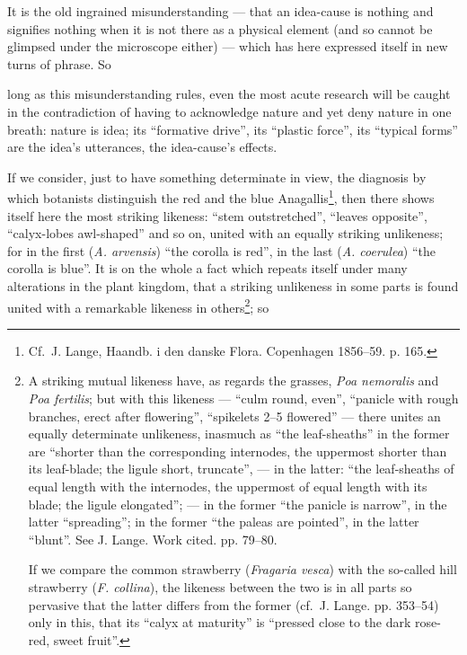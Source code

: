 \documentclass[12pt,a4paper]{book}
\begin{document}
It is the old ingrained misunderstanding --- that an idea-cause is nothing and
signifies nothing when it is not there as a physical element (and so cannot be
glimpsed under the microscope either) --- which has here expressed itself in new
turns of phrase. So

\setcounter{footnote}{0}%
long as this misunderstanding rules, even the most acute research will be caught in
the contradiction of having to acknowledge nature and yet deny nature in one
breath: nature is idea; its ``formative drive'', its ``plastic force'', its
``typical forms'' are the idea's utterances, the idea-cause's effects.

If we consider, just to have something determinate in view, the diagnosis by which
botanists distinguish the red and the blue Anagallis\footnote{Cf.\ J. Lange,
Haandb. i den danske Flora. Copenhagen 1856--59. p. 165.}, then there shows itself
here the most striking likeness: ``stem outstretched'', ``leaves opposite'',
``calyx-lobes awl-shaped'' and so on, united with an equally striking unlikeness;
for in the first (\textit{A. arvensis}) ``the corolla is red'', in the last
(\textit{A. coerulea}) ``the corolla is blue''. It is on the whole a fact which
repeats itself under many alterations in the plant kingdom, that a striking
unlikeness in some parts is found united with a remarkable likeness in
others\footnote{A striking mutual likeness have, as regards the grasses,
\textit{Poa nemoralis} and \textit{Poa fertilis}; but with this likeness ---
``culm round, even'', ``panicle with rough branches, erect after flowering'',
``spikelets 2--5 flowered'' --- there unites an equally determinate unlikeness,
inasmuch as ``the leaf-sheaths'' in the former are ``shorter than the corresponding
internodes, the uppermost shorter than its leaf-blade; the ligule short, truncate'',
--- in the latter: ``the leaf-sheaths of equal length with the internodes, the
uppermost of equal length with its blade; the ligule elongated''; --- in the former
``the panicle is narrow'', in the latter ``spreading''; in the former ``the paleas
are pointed'', in the latter ``blunt''. See J. Lange. Work cited. pp. 79--80.

If we compare the common strawberry (\textit{Fragaria vesca}) with the so-called
hill strawberry (\textit{F. collina}), the likeness between the two is in all parts
so pervasive that the latter differs from the former (cf.\ J. Lange. pp. 353--54)
only in this, that its ``calyx at maturity'' is ``pressed close to the dark
rose-red, sweet fruit''.}; so
\end{document}
